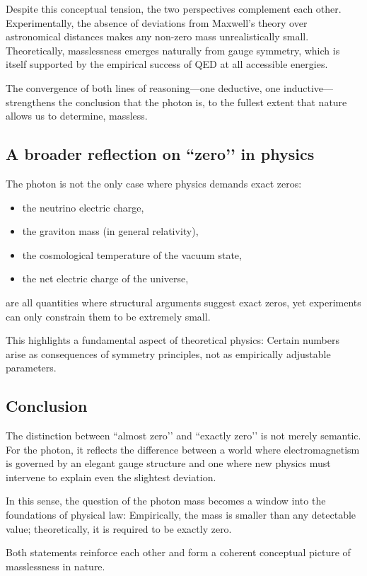 Despite this conceptual tension, the two perspectives complement each other.  
Experimentally, the absence of deviations from Maxwell’s theory over 
astronomical distances makes any non-zero mass unrealistically small.  
Theoretically, masslessness emerges naturally from gauge symmetry, which is 
itself supported by the empirical success of QED at all accessible energies.

The convergence of both lines of reasoning—one deductive, one inductive—
strengthens the conclusion that the photon is, to the fullest extent that 
nature allows us to determine, massless.

\subsection*{A broader reflection on ``zero’’ in physics}

The photon is not the only case where physics demands exact zeros:
\begin{itemize}
	\item the neutrino electric charge,
	\item the graviton mass (in general relativity),
	\item the cosmological temperature of the vacuum state,
	\item the net electric charge of the universe,
\end{itemize}
are all quantities where structural arguments suggest exact zeros, yet 
experiments can only constrain them to be extremely small.

This highlights a fundamental aspect of theoretical physics:  
Certain numbers arise as consequences of symmetry principles, not as 
empirically adjustable parameters.

\subsection*{Conclusion}

The distinction between ``almost zero’’ and ``exactly zero’’ is not merely 
semantic. For the photon, it reflects the difference between a world where 
electromagnetism is governed by an elegant gauge structure and one where 
new physics must intervene to explain even the slightest deviation.

In this sense, the question of the photon mass becomes a window into the 
foundations of physical law:  
Empirically, the mass is smaller than any detectable value;  
theoretically, it is required to be exactly zero.

Both statements reinforce each other and form a coherent conceptual picture 
of masslessness in nature.
